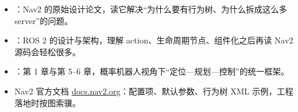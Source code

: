 \begin{reading}

\begin{itemize}
  \item \cite{macenski2020nav2}：Nav2 的原始设计论文，读它解决“为什么要有行为树、为什么拆成这么多 server”的问题。
  \item \cite{macenski2022ros2}：ROS 2 的设计与架构，理解 action、生命周期节点、组件化之后再读 Nav2 源码会轻松很多。
  \item \cite{thrun2005probabilistic}：第 1 章与第 5--6 章，概率机器人视角下“定位—规划—控制”的统一框架。
  \item Nav2 官方文档 \href{https://docs.nav2.org}{docs.nav2.org}：配置项、默认参数、行为树 XML 示例，工程落地时按图索骥。
\end{itemize}


\end{reading}
